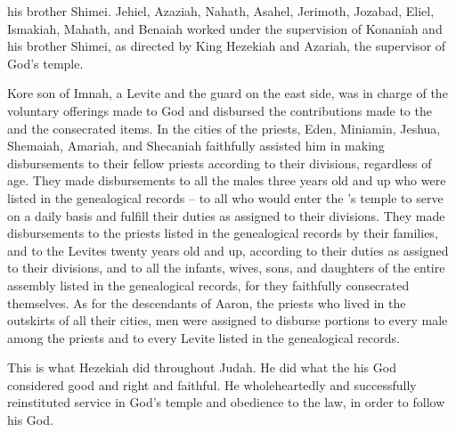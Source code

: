 {his brother
Shimei.
Jehiel,
Azaziah,
Nahath,
Asahel,
Jerimoth,
Jozabad,
Eliel,
Ismakiah,
Mahath,
and Benaiah
worked under
the supervision
of Konaniah
and his brother
Shimei,
as directed
by King
Hezekiah
and Azariah,
the supervisor
of God’s
temple.
\par }{\PP {}Kore
son
of Imnah,
a Levite
and the guard
on the east
side, was in charge
of the voluntary
offerings made to God
and disbursed
the contributions
made to the
{}
and the consecrated
items.
In
the cities
of the priests,
Eden,
Miniamin,
Jeshua,
Shemaiah,
Amariah,
and Shecaniah
faithfully
assisted him in making disbursements
to their fellow priests
according to their divisions,
regardless of age.
They made disbursements to all
the males
three
years
old
and up who
were listed in the genealogical records
– to all
who would enter
the
{}’s
temple
to serve on
a daily
basis
and fulfill
their duties
as assigned to their divisions.
They made disbursements to the priests
listed in the genealogical records
by their families,
and to the Levites
twenty
years
old and up, according to their duties
as assigned to their divisions,
and to all
the infants,
wives,
sons,
and daughters
of the entire
assembly
listed in the genealogical records,
for
they faithfully
consecrated themselves.
As for the descendants
of Aaron,
the priests
who lived in the outskirts
of all
their cities,
men
were assigned
to disburse
portions
to every
male
among the priests
and to every
Levite
listed in the genealogical records.
\par }{\PP {}This
is what
Hezekiah
did
throughout
Judah.
He did
what the
{}
his God
considered good
and right
and faithful.
He wholeheartedly
and successfully reinstituted
service
in God’s
temple
and obedience
to the law,
in order
to follow
his God.

}
